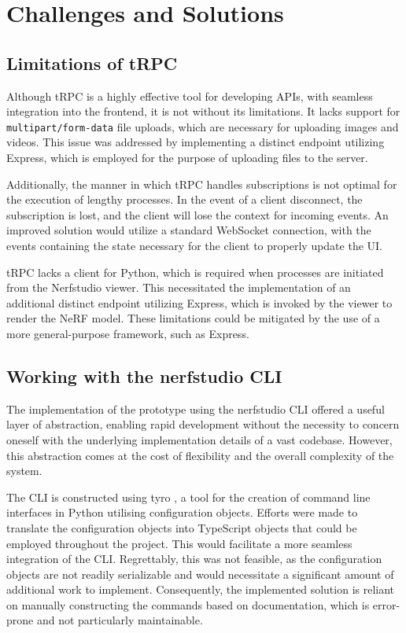 \section{Challenges and Solutions}
\label{sec:system:challenges}

\subsection*{Limitations of tRPC}

Although tRPC is a highly effective tool for developing APIs, with seamless integration into the frontend, it is not without its limitations.
It lacks support for \texttt{multipart/form-data} file uploads, which are necessary for uploading images and videos.
This issue was addressed by implementing a distinct endpoint utilizing Express, which is employed for the purpose of uploading files to the server.

Additionally, the manner in which tRPC handles subscriptions is not optimal for the execution of lengthy processes.
In the event of a client disconnect, the subscription is lost, and the client will lose the context for incoming events.
An improved solution would utilize a standard WebSocket connection, with the events containing the state necessary for the client to properly update the UI.

tRPC lacks a client for Python, which is required when processes are initiated from the Nerfstudio viewer.
This necessitated the implementation of an additional distinct endpoint utilizing Express, which is invoked by the viewer to render the NeRF model.
These limitations could be mitigated by the use of a more general-purpose framework, such as Express.

\subsection*{Working with the nerfstudio CLI}

The implementation of the prototype using the nerfstudio CLI offered a useful layer of abstraction, enabling rapid development without the necessity to concern oneself with the underlying implementation details of a vast codebase.
However, this abstraction comes at the cost of flexibility and the overall complexity of the system.

The CLI is constructed using tyro \cite{yi_tyro_nodate}, a tool for the creation of command line interfaces in Python utilising configuration objects.
Efforts were made to translate the configuration objects into TypeScript objects that could be employed throughout the project.
This would facilitate a more seamless integration of the CLI.
Regrettably, this was not feasible, as the configuration objects are not readily serializable and would necessitate a significant amount of additional work to implement.
Consequently, the implemented solution is reliant on manually constructing the commands based on documentation, which is error-prone and not particularly maintainable.
